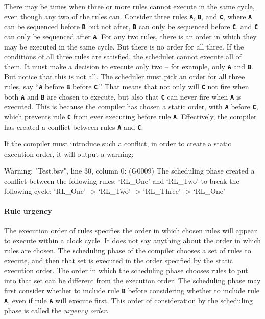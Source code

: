 \documentclass{article}
\newenvironment{centerboxverbatim}
  {\center
   \boxedverbatim}
  {\endboxedverbatim
  {\endcenter }}
\begin{document}
There may be times when three or more rules cannot execute in
the same cycle, even though any two of the rules can.  Consider three
rules {\bf\tt A}, {\bf\tt B}, and {\bf\tt C}, where {\bf\tt A} can be
sequenced before {\bf\tt B} but not after, {\bf\tt B} can only be
sequenced before {\bf\tt C}, and {\bf\tt C} can only be sequenced
after {\bf\tt A}.  For any two rules, there is an order in which they
may be executed in the same cycle.  But there is no order for all
three.  If the conditions of all three rules are satisfied, the
scheduler cannot execute all of them.  It must make a decision to execute
only two -- for example, only {\bf\tt A} and {\bf\tt B}.  But notice
that this is not all.  The scheduler must pick an order for all three
rules, say ``{\bf\tt A} before {\bf\tt B} before {\bf\tt C}.''  That
means that not only will {\bf\tt C} not fire when both {\bf\tt A} and
{\bf\tt B} are chosen to execute, but also that {\bf\tt C} can never
fire when {\bf\tt A} is executed.  This is because the compiler has
chosen a static order, with {\bf\tt A} before {\bf\tt C}, which
prevents rule {\bf\tt C} from ever executing before rule {\bf\tt A}.
Effectively, the compiler has created a conflict between rules
{\bf\tt A} and {\bf\tt C}.

If the compiler must introduce such a conflict, in order to create
a static execution order, it will output a warning:

\begin{centerboxverbatim}
Warning: "Test.bsv", line 30, column 0: (G0009)
  The scheduling phase created a conflict between the following rules:
      `RL_One' and `RL_Two'
  to break the following cycle:
      `RL_One' -> `RL_Two' -> `RL_Three' -> `RL_One'
\end{centerboxverbatim}

\paragraph{Rule urgency}

The execution order of rules specifies the order in which chosen rules
will appear to execute within a clock cycle.  It does not say anything
about the order in which rules are chosen.  The scheduling phase of the
compiler chooses a set of rules to execute, and then that set is
executed in the order specified by the static execution order.  The
order in which the scheduling phase chooses rules to put into that set
can be different from the execution order.  The scheduling phase may
first consider whether to include rule {\bf\tt B} before considering
whether to include rule {\bf\tt A}, even if rule {\bf\tt A} will
execute first.  This order of consideration by the scheduling phase
is called the \emph{urgency order}.
\end{document}
